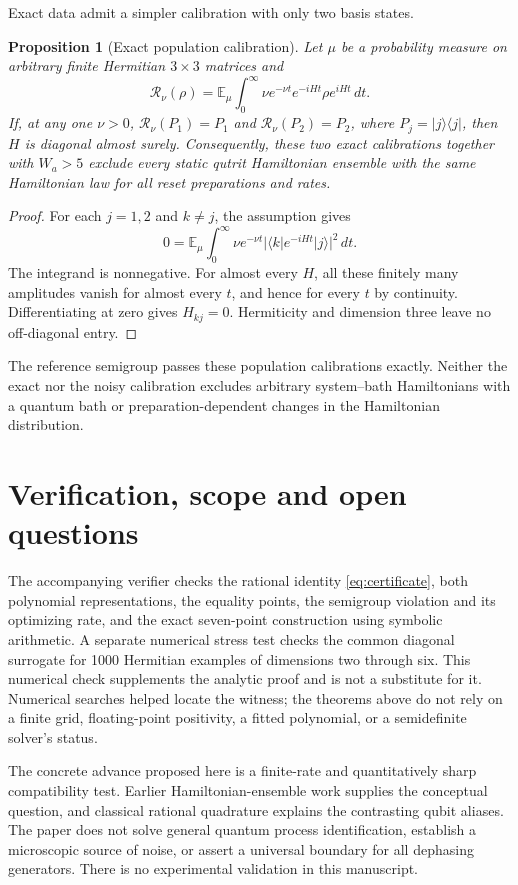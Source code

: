 \documentclass[11pt,a4paper]{article}
\newtheorem{proposition}[theorem]{Proposition}
\newcommand{\E}{\mathbb E}
\begin{document}
Exact data admit a simpler calibration with only two basis states.

\begin{proposition}[Exact population calibration]\label{prop:diag}
Let $\mu$ be a probability measure on arbitrary finite Hermitian
$3\times3$ matrices and
\[
 \mathcal R_\nu(\rho)=\E_\mu\int_0^\infty\nu e^{-\nu t}
              e^{-iHt}\rho e^{iHt}\,dt.
\]
If, at any one $\nu>0$,
$\mathcal R_\nu(P_1)=P_1$ and $\mathcal R_\nu(P_2)=P_2$,
where $P_j=|j\rangle\langle j|$, then $H$ is diagonal almost surely.
Consequently, these two exact calibrations together with
$W_a>5$ exclude every static qutrit Hamiltonian ensemble with the
same Hamiltonian law for all reset preparations and rates.
\end{proposition}
\begin{proof}
For each $j=1,2$ and $k\ne j$, the assumption gives
\[
 0=\E_\mu\int_0^\infty\nu e^{-\nu t}
                 |\langle k|e^{-iHt}|j\rangle|^2\,dt.
\]
The integrand is nonnegative. For almost every $H$, all these
finitely many amplitudes vanish for almost every $t$, and hence for
every $t$ by continuity. Differentiating at zero gives
$H_{kj}=0$. Hermiticity and dimension three leave no off-diagonal
entry.
\end{proof}

The reference semigroup passes these population calibrations exactly.
Neither the exact nor the noisy calibration excludes arbitrary
system--bath Hamiltonians with a quantum bath or preparation-dependent
changes in the Hamiltonian distribution.

\section{Verification, scope and open questions}
The accompanying verifier checks the rational identity
\eqref{eq:certificate}, both polynomial representations, the
equality points, the semigroup violation and its optimizing rate,
and the exact seven-point construction using symbolic arithmetic.
A separate numerical stress test checks the common diagonal surrogate
for 1000 Hermitian examples of dimensions two through six. This
numerical check supplements the analytic proof and is not a substitute
for it.
Numerical searches helped locate the witness; the theorems above
do not rely on a finite grid, floating-point positivity, a fitted
polynomial, or a semidefinite solver's status.

The concrete advance proposed here is a finite-rate and quantitatively
sharp compatibility test. Earlier Hamiltonian-ensemble work supplies
the conceptual question, and classical rational quadrature explains
the contrasting qubit aliases. The paper does not solve general
quantum process identification, establish a microscopic source of
noise, or assert a universal boundary for all dephasing generators.
There is no experimental validation in this manuscript.
\end{document}
